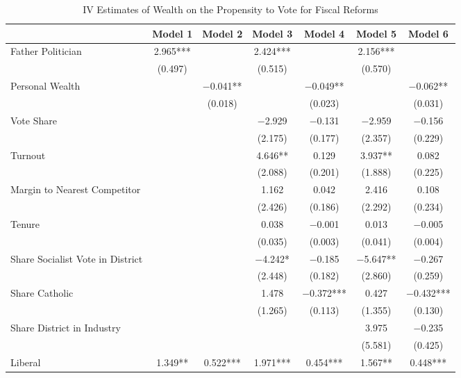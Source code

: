 \begin{table}

\caption{\label{tab:ivresults_fisc}IV Estimates of Wealth on the Propensity to Vote for Fiscal Reforms}
\centering
\begin{tabular}[t]{lcccccc}
\toprule
  & Model 1 & Model 2 & Model 3 & Model 4 & Model 5 & Model 6\\
\midrule
Father Politician & \num{2.965}*** &  & \num{2.424}*** &  & \num{2.156}*** & \\
 & (\num{0.497}) &  & (\num{0.515}) &  & (\num{0.570}) & \\
Personal Wealth &  & \num{-0.041}** &  & \num{-0.049}** &  & \num{-0.062}**\\
 &  & (\num{0.018}) &  & (\num{0.023}) &  & (\num{0.031})\\
Vote Share &  &  & \num{-2.929} & \num{-0.131} & \num{-2.959} & \num{-0.156}\\
 &  &  & (\num{2.175}) & (\num{0.177}) & (\num{2.357}) & (\num{0.229})\\
Turnout &  &  & \num{4.646}** & \num{0.129} & \num{3.937}** & \num{0.082}\\
 &  &  & (\num{2.088}) & (\num{0.201}) & (\num{1.888}) & (\num{0.225})\\
Margin to Nearest Competitor &  &  & \num{1.162} & \num{0.042} & \num{2.416} & \num{0.108}\\
 &  &  & (\num{2.426}) & (\num{0.186}) & (\num{2.292}) & (\num{0.234})\\
Tenure &  &  & \num{0.038} & \num{-0.001} & \num{0.013} & \num{-0.005}\\
 &  &  & (\num{0.035}) & (\num{0.003}) & (\num{0.041}) & (\num{0.004})\\
Share Socialist Vote in District &  &  & \num{-4.242}* & \num{-0.185} & \num{-5.647}** & \num{-0.267}\\
 &  &  & (\num{2.448}) & (\num{0.182}) & (\num{2.860}) & (\num{0.259})\\
Share Catholic &  &  & \num{1.478} & \num{-0.372}*** & \num{0.427} & \num{-0.432}***\\
 &  &  & (\num{1.265}) & (\num{0.113}) & (\num{1.355}) & (\num{0.130})\\
Share District in Industry &  &  &  &  & \num{3.975} & \num{-0.235}\\
 &  &  &  &  & (\num{5.581}) & (\num{0.425})\\
Liberal & \num{1.349}** & \num{0.522}*** & \num{1.971}*** & \num{0.454}*** & \num{1.567}** & \num{0.448}***\\

\end{tabular}
\end{table}
